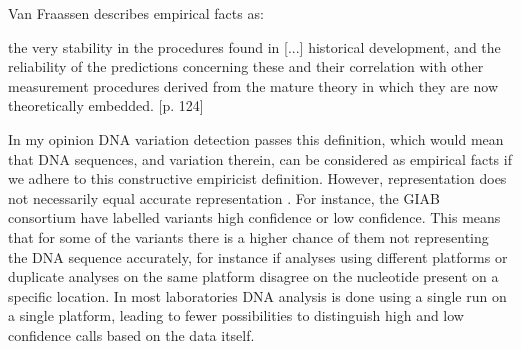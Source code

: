 Van Fraassen describes empirical facts as: \newline

\hfill\begin{minipage}{\dimexpr\textwidth-1cm}
the very stability in the procedures found in [...] historical development, and the reliability of the predictions concerning these and their correlation with other measurement procedures derived from the mature theory in which they are now theoretically embedded. [p. 124]
\end{minipage} \newline \newline

\noindent In my opinion DNA variation detection passes this definition, which would mean that DNA sequences, and variation therein, can be considered as empirical facts if we adhere to this constructive empiricist definition. 
However, representation does not necessarily equal accurate representation \cite{Nguyen_2016}. 
For instance, the GIAB consortium have labelled variants high confidence or low confidence. 
This means that for some of the variants there is a higher chance of them not representing the DNA sequence accurately, for instance if analyses using different platforms or duplicate analyses on the same platform disagree on the nucleotide present on a specific location. 
In most laboratories DNA analysis is done using a single run on a single platform, leading to fewer possibilities to distinguish high and low confidence calls based on the data itself. 

